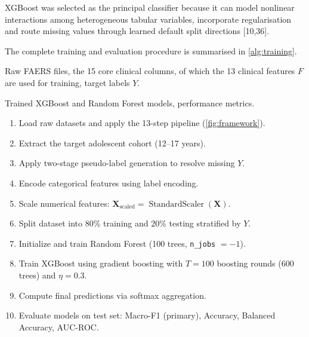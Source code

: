 \documentclass[10pt]{article}
\begin{document}
XGBoost was selected as the principal classifier because it can model nonlinear interactions among heterogeneous tabular variables, incorporate regularisation and route missing values through learned default split directions [10,36].

The complete training and evaluation procedure is summarised in \cref{alg:training}.

\begin{algorithm}[H]
\caption{Leakage-aware tabular model training and evaluation pipeline}
\label{alg:training}
\begin{description}[leftmargin=0.5cm,noitemsep,topsep=2pt]
  \item[\textbf{Input:}] Raw FAERS files, the 15 core clinical columns, of which the 13 clinical features $F$ are used for training, target labels $Y$.
  \item[\textbf{Output:}] Trained XGBoost and Random Forest models, performance metrics.
\end{description}
\begin{enumerate}[leftmargin=0.5cm,noitemsep,topsep=2pt,label=\arabic*.]
  \item Load raw datasets and apply the 13-step pipeline (\cref{fig:framework}).
  \item Extract the target adolescent cohort (12--17 years).
  \item Apply two-stage pseudo-label generation to resolve missing $Y$.
  \item Encode categorical features using label encoding.
  \item Scale numerical features: $\mathbf{X}_{\text{scaled}} = \operatorname{StandardScaler}(\mathbf{X})$.
  \item Split dataset into 80\% training and 20\% testing stratified by $Y$.
  \item Initialize and train Random Forest (100 trees, \texttt{n\_jobs} $= -1$).
  \item Train XGBoost using gradient boosting with $T = 100$ boosting rounds (600 trees) and $\eta = 0.3$.
  \item Compute final predictions via softmax aggregation.
  \item Evaluate models on test set: Macro-F1 (primary), Accuracy, Balanced Accuracy, AUC-ROC.
\end{enumerate}
\end{algorithm}
\end{document}
